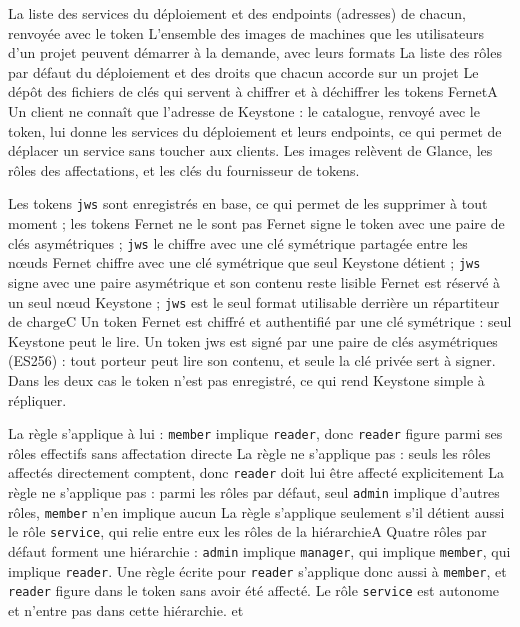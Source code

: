   {La liste des services du déploiement et des endpoints (adresses) de chacun, renvoyée avec le token}
  {L'ensemble des images de machines que les utilisateurs d'un projet peuvent démarrer à la demande, avec leurs formats}
  {La liste des rôles par défaut du déploiement et des droits que chacun accorde sur un projet}
  {Le dépôt des fichiers de clés qui servent à chiffrer et à déchiffrer les tokens Fernet}{A}
  {Un client ne connaît que l'adresse de Keystone : le catalogue, renvoyé avec le token, lui donne les services du déploiement et leurs endpoints, ce qui permet de déplacer un service sans toucher aux clients. Les images relèvent de Glance, les rôles des affectations, et les clés du fournisseur de tokens.}
  {}

  {Les tokens \texttt{jws} sont enregistrés en base, ce qui permet de les supprimer à tout moment ; les tokens Fernet ne le sont pas}
  {Fernet signe le token avec une paire de clés asymétriques ; \texttt{jws} le chiffre avec une clé symétrique partagée entre les nœuds}
  {Fernet chiffre avec une clé symétrique que seul Keystone détient ; \texttt{jws} signe avec une paire asymétrique et son contenu reste lisible}
  {Fernet est réservé à un seul nœud Keystone ; \texttt{jws} est le seul format utilisable derrière un répartiteur de charge}{C}
  {Un token Fernet est chiffré et authentifié par une clé symétrique : seul Keystone peut le lire. Un token jws est signé par une paire de clés asymétriques (ES256) : tout porteur peut lire son contenu, et seule la clé privée sert à signer. Dans les deux cas le token n'est pas enregistré, ce qui rend Keystone simple à répliquer.}
  {}

  {La règle s'applique à lui : \texttt{member} implique \texttt{reader}, donc \texttt{reader} figure parmi ses rôles effectifs sans affectation directe}
  {La règle ne s'applique pas : seuls les rôles affectés directement comptent, donc \texttt{reader} doit lui être affecté explicitement}
  {La règle ne s'applique pas : parmi les rôles par défaut, seul \texttt{admin} implique d'autres rôles, \texttt{member} n'en implique aucun}
  {La règle s'applique seulement s'il détient aussi le rôle \texttt{service}, qui relie entre eux les rôles de la hiérarchie}{A}
  {Quatre rôles par défaut forment une hiérarchie : \texttt{admin} implique \texttt{manager}, qui implique \texttt{member}, qui implique \texttt{reader}. Une règle écrite pour \texttt{reader} s'applique donc aussi à \texttt{member}, et \texttt{reader} figure dans le token sans avoir été affecté. Le rôle \texttt{service} est autonome et n'entre pas dans cette hiérarchie.}
  { et }

